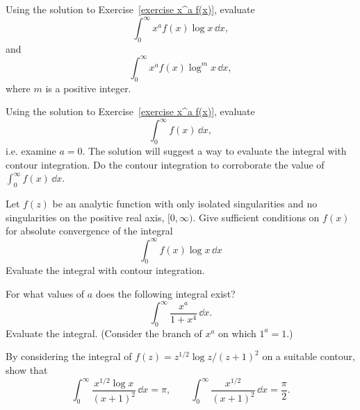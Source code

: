 {\begin{Exercise}
\end{Exercise}



\begin{Exercise}
  \label{exercise x^a f(x) log x}
  Using the solution to Exercise~\ref{exercise x^a f(x)}, evaluate
  \[
  \int_0^\infty x^a f(x) \log x \,\dd x,
  \]
  and 
  \[
  \int_0^\infty x^a f(x) \log^m x \,\dd x,
  \]
  where $m$ is a positive integer.

\end{Exercise}



\begin{Exercise}
  \label{exercise intzi f(x)}
  Using the solution to Exercise~\ref{exercise x^a f(x)}, evaluate
  \[
  \int_0^\infty f(x) \,\dd x,
  \]
  i.e. examine $a = 0$.  The solution will suggest a way to evaluate the integral
  with contour integration.  Do the contour integration to corroborate the
  value of $\int_0^\infty f(x) \,\dd x$.

\end{Exercise}



\begin{Exercise}
  \label{exercise f(x) log x}
  Let $f(z)$ be an analytic function with only isolated
  singularities and no singularities on the positive real axis, $[0,\infty)$.
  Give sufficient conditions on $f(x)$ for absolute convergence of the integral
  \[
  \int_0^\infty f(x) \log x \,\dd x
  \]
  Evaluate the integral with contour integration.

\end{Exercise}



\begin{Exercise}
  \label{exercise x^a/(1+x^4)}
  For what values of $a$ does the following integral exist?
  \[
  \int_0^\infty \frac{x^a}{1+x^4} \,\dd x.
  \]
  Evaluate the integral.  (Consider the branch of $x^a$ on which $1^a = 1$.)

\end{Exercise}



\begin{Exercise}
  \label{exercise x^(1/2) log x / (x+1)^2}
  By considering the integral of $f(z) = z^{1/2} \log z / (z+1)^2$ on a 
  suitable contour, show that
  \[
  \int_0^\infty \frac{x^{1/2} \log x}{(x+1)^2} \,\dd x = \pi, \qquad
  \int_0^\infty \frac{x^{1/2}}{(x+1)^2} \,\dd x = \frac{\pi}{2}.
  \]


\end{Exercise}}
